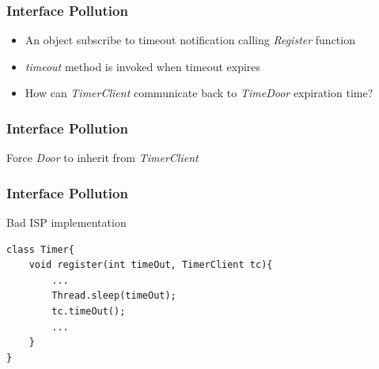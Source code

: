 \documentclass{beamer}
\begin{document}
\begin{frame}
  \frametitle{Interface Pollution}
  \begin{itemize}
	\item<+-> An object subscribe to timeout notification calling \textit{Register} function 
	\item<+-> \textit{timeout} method is invoked when timeout expires 
	\item<+-> How can \textit{TimerClient} communicate back to \textit{TimeDoor} expiration time?
   \end{itemize}
\end{frame}

\begin{frame}
	\frametitle{Interface Pollution}
	Force \textit{Door} to inherit from \textit{TimerClient}
	\begin{center}
	\end{center}
\end{frame}

\begin{frame}[containsverbatim]
	\frametitle{Interface Pollution}
	Bad ISP implementation\\
	\begin{lstlisting}
class Timer{
    void register(int timeOut, TimerClient tc){
        ...
        Thread.sleep(timeOut);
        tc.timeOut();
        ...
    }
}
	\end{lstlisting}
\end{frame}
\end{document}
